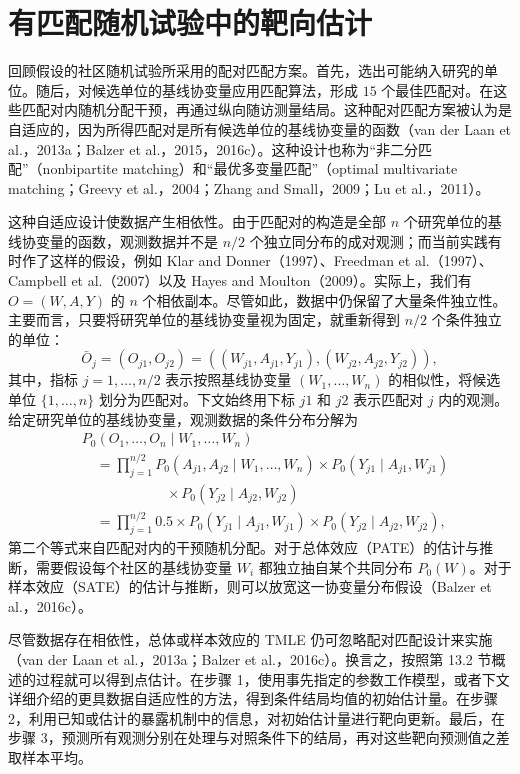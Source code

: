 \section{有匹配随机试验中的靶向估计}
\label{sec:ch13-with-matching}

回顾假设的社区随机试验所采用的配对匹配方案。首先，选出可能纳入研究的单位。随后，对候选单位的基线协变量应用匹配算法，形成 $15$ 个最佳匹配对。在这些匹配对内随机分配干预，再通过纵向随访测量结局。这种配对匹配方案被认为是自适应的，因为所得匹配对是所有候选单位的基线协变量的函数（van der Laan et al.，2013a；Balzer et al.，2015，2016c）。这种设计也称为“非二分匹配”（nonbipartite matching）和“最优多变量匹配”（optimal multivariate matching；Greevy et al.，2004；Zhang and Small，2009；Lu et al.，2011）。

这种自适应设计使数据产生相依性。由于匹配对的构造是全部 $n$ 个研究单位的基线协变量的函数，观测数据并不是 $n/2$ 个独立同分布的成对观测；而当前实践有时作了这样的假设，例如 Klar and Donner（1997）、Freedman et al.（1997）、Campbell et al.（2007）以及 Hayes and Moulton（2009）。实际上，我们有 $O=(W,A,Y)$ 的 $n$ 个相依副本。尽管如此，数据中仍保留了大量条件独立性。主要而言，只要将研究单位的基线协变量视为固定，就重新得到 $n/2$ 个条件独立的单位：
\[
 \bar O_j=(O_{j1},O_{j2})
 =((W_{j1},A_{j1},Y_{j1}),(W_{j2},A_{j2},Y_{j2})),
\]
其中，指标 $j=1,\ldots,n/2$ 表示按照基线协变量 $(W_1,\ldots,W_n)$ 的相似性，将候选单位 $\{1,\ldots,n\}$ 划分为匹配对。下文始终用下标 $j1$ 和 $j2$ 表示匹配对 $j$ 内的观测。给定研究单位的基线协变量，观测数据的条件分布分解为
\[
 \begin{aligned}
 &P_0(O_1,\ldots,O_n\mid W_1,\ldots,W_n)\\
 &\quad=\prod_{j=1}^{n/2}
   P_0(A_{j1},A_{j2}\mid W_1,\ldots,W_n)
   \times P_0(Y_{j1}\mid A_{j1},W_{j1})\\
 &\qquad\qquad\qquad{}\times P_0(Y_{j2}\mid A_{j2},W_{j2})\\
 &\quad=\prod_{j=1}^{n/2}0.5
   \times P_0(Y_{j1}\mid A_{j1},W_{j1})
   \times P_0(Y_{j2}\mid A_{j2},W_{j2}),
 \end{aligned}
\]
第二个等式来自匹配对内的干预随机分配。对于总体效应（PATE）的估计与推断，需要假设每个社区的基线协变量 $W_i$ 都独立抽自某个共同分布 $P_0(W)$。对于样本效应（SATE）的估计与推断，则可以放宽这一协变量分布假设（Balzer et al.，2016c）。

尽管数据存在相依性，总体或样本效应的 TMLE 仍可忽略配对匹配设计来实施（van der Laan et al.，2013a；Balzer et al.，2016c）。换言之，按照第 13.2 节概述的过程就可以得到点估计。在步骤 1，使用事先指定的参数工作模型，或者下文详细介绍的更具数据自适应性的方法，得到条件结局均值的初始估计量。在步骤 2，利用已知或估计的暴露机制中的信息，对初始估计量进行靶向更新。最后，在步骤 3，预测所有观测分别在处理与对照条件下的结局，再对这些靶向预测值之差取样本平均。

